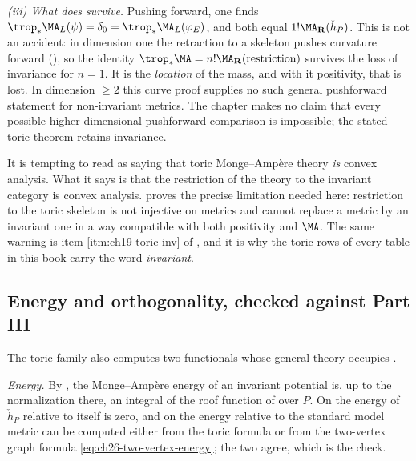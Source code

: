\begin{example}
\emph{(iii) What does survive.}  Pushing forward, one finds
$\trop_*\MA_L(\psi)=\delta_0=\trop_*\MA_L(\varphi_E)$, and both equal
$1!\MA_{\mathbf R}(\check h_P)$.  This is not an accident: in dimension one
the retraction to a skeleton pushes curvature forward
(), so the identity
$\trop_*\MA=n!\MA_{\mathbf R}(\text{restriction})$ survives the loss of
invariance for $n=1$.  It is the \emph{location} of the mass, and with it
positivity, that is lost.  In dimension $\geq2$ this curve proof supplies no such general
pushforward statement for non-invariant metrics.  The chapter makes no
claim that every possible higher-dimensional pushforward comparison is
impossible; the stated toric theorem retains invariance.
\end{example}

\begin{remark}
\label{rem:ch31-invariance-is-a-hypothesis}
It is tempting to read  as saying that toric
Monge--Amp\`ere theory \emph{is} convex analysis.  What it says is that the
restriction of the theory to the invariant category is convex analysis.
 proves the precise limitation needed here:
restriction to the toric skeleton is not injective on metrics and cannot
replace a metric by an invariant one in a way compatible with both
positivity and $\MA$.  The same warning is item
\cref{itm:ch19-toric-inv} of
, and it is why the toric rows of every
table in this book carry the word \emph{invariant}.
\end{remark}

\subsection{Energy and orthogonality, checked against Part III}
\label{sec:ch31-toric-energy}

The toric family also computes two functionals whose general theory occupies
.

\emph{Energy.}  By , the Monge--Amp\`ere energy
of an invariant potential is, up to the normalization there, an integral of
the roof function of  over $P$.  On
 the energy of $\check h_P$ relative to itself
is zero, and on  the energy relative to the
standard model metric can be computed either from the toric formula or from
the two-vertex graph formula \eqref{eq:ch26-two-vertex-energy}; the two
agree, which is the check.

